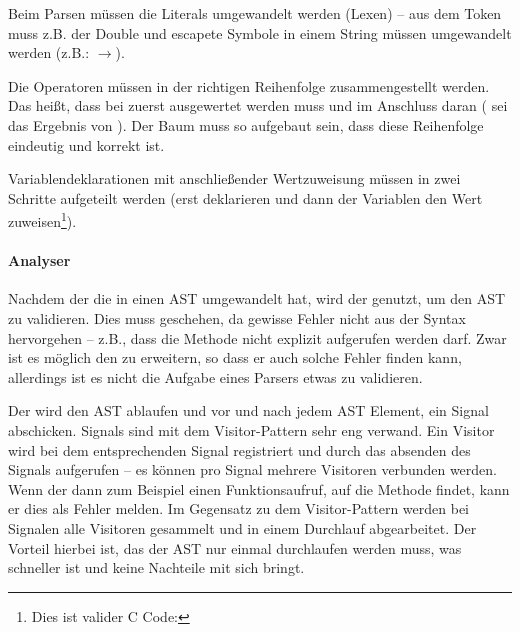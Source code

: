 {        Beim Parsen müssen die Literals umgewandelt werden (Lexen) -- aus dem Token  muss z.B. der Double  und escapete Symbole in einem String müssen umgewandelt werden (z.B.: $\rightarrow$).

        Die Operatoren müssen in der richtigen Reihenfolge zusammengestellt werden. Das heißt, dass bei  zuerst  ausgewertet werden muss und im Anschluss daran  ( sei das Ergebnis von ). Der Baum muss so aufgebaut sein, dass diese Reihenfolge eindeutig und korrekt ist.

        Variablendeklarationen mit anschließender Wertzuweisung müssen in zwei Schritte aufgeteilt werden (erst deklarieren und dann der Variablen den Wert zuweisen\footnote{
          Dies ist valider C Code: 
        }).

      \paragraph{Analyser}
        Nachdem der  die  in einen AST umgewandelt hat, wird der  genutzt, um den AST zu validieren. Dies muss geschehen, da gewisse Fehler nicht aus der Syntax hervorgehen -- z.B., dass die  Methode nicht explizit aufgerufen werden darf. Zwar ist es möglich den  zu erweitern, so dass er auch solche Fehler finden kann, allerdings ist es nicht die Aufgabe eines Parsers etwas zu validieren.

        Der  wird den AST ablaufen und vor und nach jedem AST Element, ein Signal abschicken. Signals sind mit dem Visitor-Pattern \autocite[S.366]{Gamma:1995:DPE:186897} sehr eng verwand. Ein Visitor wird bei dem entsprechenden Signal registriert und durch das absenden des Signals aufgerufen -- es können pro Signal mehrere Visitoren verbunden werden. Wenn der  dann zum Beispiel einen Funktionsaufruf, auf die  Methode findet, kann er dies als Fehler melden. Im Gegensatz zu dem Visitor-Pattern werden bei Signalen alle Visitoren gesammelt und in einem Durchlauf abgearbeitet. Der Vorteil hierbei ist, das der AST nur einmal durchlaufen werden muss, was schneller ist und keine Nachteile mit sich bringt.

}

